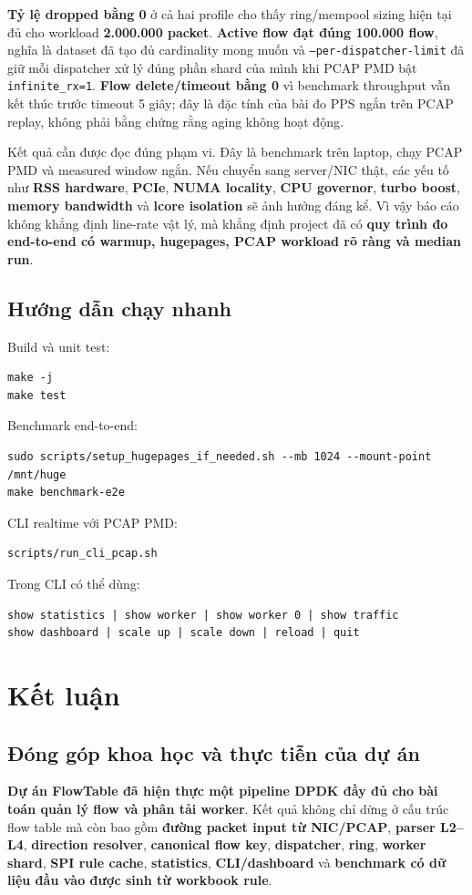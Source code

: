 \documentclass[12pt,a4paper,twoside]{report}
\newcommand{\code}[1]{\texttt{#1}}
\begin{document}
\textbf{Tỷ lệ dropped bằng 0} ở cả hai profile cho thấy ring/mempool sizing hiện
tại đủ cho workload \textbf{2.000.000 packet}. \textbf{Active flow đạt đúng
100.000 flow}, nghĩa là dataset đã tạo đủ cardinality mong muốn và
\code{--per-dispatcher-limit} đã giữ mỗi dispatcher xử lý đúng phần shard của
mình khi PCAP PMD bật \code{infinite\_rx=1}. \textbf{Flow delete/timeout bằng 0}
vì benchmark throughput vẫn kết thúc trước timeout 5 giây; đây là đặc tính của
bài đo PPS ngắn trên PCAP replay, không phải bằng chứng rằng aging không hoạt
động.

Kết quả cần được đọc đúng phạm vi. Đây là benchmark trên laptop, chạy PCAP PMD
và measured window ngắn. Nếu chuyển sang server/NIC thật, các yếu tố như
\textbf{RSS hardware}, \textbf{PCIe}, \textbf{NUMA locality}, \textbf{CPU
governor}, \textbf{turbo boost}, \textbf{memory bandwidth} và \textbf{lcore
isolation} sẽ ảnh hưởng đáng kể. Vì vậy báo cáo không khẳng định line-rate vật
lý, mà khẳng định project đã có \textbf{quy trình đo end-to-end có warmup,
hugepages, PCAP workload rõ ràng và median run}.

\section{Hướng dẫn chạy nhanh}
Build và unit test:
\begin{verbatim}
make -j
make test
\end{verbatim}

Benchmark end-to-end:
\begin{verbatim}
sudo scripts/setup_hugepages_if_needed.sh --mb 1024 --mount-point /mnt/huge
make benchmark-e2e
\end{verbatim}

CLI realtime với PCAP PMD:
\begin{verbatim}
scripts/run_cli_pcap.sh
\end{verbatim}

Trong CLI có thể dùng:
\begin{verbatim}
show statistics | show worker | show worker 0 | show traffic
show dashboard | scale up | scale down | reload | quit
\end{verbatim}

\newpage
\chapter{Kết luận}

\section{Đóng góp khoa học và thực tiễn của dự án}
\textbf{Dự án FlowTable đã hiện thực một pipeline DPDK đầy đủ cho bài toán quản
lý flow và phân tải worker}. Kết quả không chỉ dừng ở cấu trúc flow table mà
còn bao gồm \textbf{đường packet input từ NIC/PCAP}, \textbf{parser L2--L4},
\textbf{direction resolver}, \textbf{canonical flow key}, \textbf{dispatcher},
\textbf{ring}, \textbf{worker shard}, \textbf{SPI rule cache},
\textbf{statistics}, \textbf{CLI/dashboard} và \textbf{benchmark có dữ liệu đầu
vào được sinh từ workbook rule}.
\end{document}
